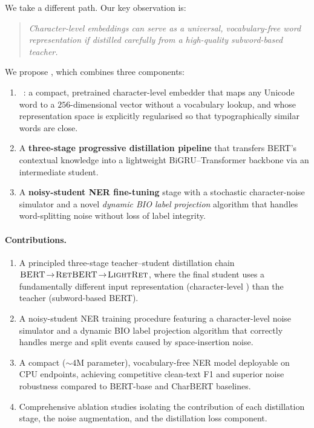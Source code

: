 We take a different path.  Our key observation is:

\begin{quote}
\emph{Character-level embeddings can serve as a universal, vocabulary-free
word representation if distilled carefully from a high-quality subword-based
teacher.}
\end{quote}

We propose \LightRet{}, which combines three components:

\begin{enumerate}
  \item \textbf{\RetVec{}}~\citep{sander2023retvec}: a compact, pretrained
        character-level embedder that maps any Unicode word to a
        $256$-dimensional vector without a vocabulary lookup, and whose
        representation space is explicitly regularised so that typographically
        similar words are close.
  \item A \textbf{three-stage progressive distillation pipeline} that transfers
        BERT's contextual knowledge into a lightweight
        BiGRU--Transformer backbone via an intermediate \RetBERT{} student.
  \item A \textbf{noisy-student NER fine-tuning} stage with a stochastic
        character-noise simulator and a novel \emph{dynamic BIO label projection}
        algorithm that handles word-splitting noise without loss of label
        integrity.
\end{enumerate}

\paragraph{Contributions.}
\begin{enumerate}
  \item A principled three-stage teacher--student distillation chain
        $\textsc{BERT} \!\to\! \textsc{RetBERT}{} \!\to\! \textsc{LightRet}{}$, where the final
        student uses a fundamentally different input representation
        (character-level \RetVec{}) than the teacher (subword-based BERT).
  \item A noisy-student NER training procedure featuring a character-level
        noise simulator and a dynamic BIO label projection algorithm that
        correctly handles merge and split events caused by space-insertion
        noise.
  \item A compact (${\sim}4$M parameter), vocabulary-free NER model
        deployable on CPU endpoints, achieving competitive clean-text F1 and
        superior noise robustness compared to BERT-base and CharBERT baselines.
  \item Comprehensive ablation studies isolating the contribution of each
        distillation stage, the noise augmentation, and the distillation loss
        component.
\end{enumerate}
